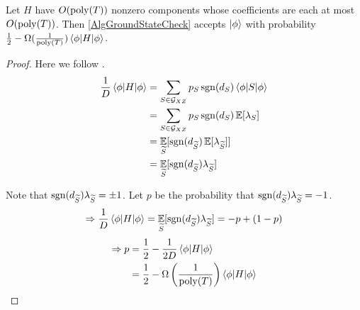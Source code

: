 \begin{thm}\label{ThmXZCheck}
	Let $H$ have $O(\operatorname*{\operatorname{poly}}(T))$ nonzero components whose coefficients are each at most $O(\operatorname*{\operatorname{poly}}(T))$.
	Then \autoref{AlgGroundStateCheck} accepts $\ket\phi$ with probability $\frac{1}{2}-\Omega(\frac{1}{\operatorname*{\operatorname{poly}}(T)})\braket{\phi|H|\phi}$.
\end{thm}
\begin{proof}

	Here we follow \cite{PhysRevA.93.022326}.
	\begin{align*}
		\frac{1}{D}\braket{\phi|H|\phi}&=\sum_{S\in\mathcal{G}_{XZ}} p_S\operatorname{sgn}(d_S)\braket{\phi|S|\phi}\\
		&=\sum_{S\in\mathcal{G}_{XZ}} p_S\operatorname{sgn}(d_S)\operatorname*{\mathbb{E}}[\lambda_S]\\
		&=\operatorname*{\mathbb{E}}_{\widetilde{S}}[\operatorname{sgn}(d_{\widetilde{S}})\operatorname*{\mathbb{E}}[\lambda_{\widetilde{S}}]]\\
		&=\operatorname*{\mathbb{E}}_{\widetilde{S}}[\operatorname{sgn}(d_{\widetilde{S}})\lambda_{\widetilde{S}}]
	\end{align*}

	Note that $\operatorname{sgn}(d_{\widetilde{S}})\lambda_{\widetilde{S}}=\pm1$. Let $p$ be the probability that $\operatorname{sgn}(d_{\widetilde{S}})\lambda_{\widetilde{S}}=-1$.
	$$\Rightarrow \frac{1}{D}\braket{\phi|H|\phi}=\operatorname*{\mathbb{E}}_{\widetilde{S}}[\operatorname{sgn}(d_{\widetilde{S}})\lambda_{\widetilde{S}}]=-p+(1-p)$$
	\begin{align*}
		\Rightarrow p&=\frac{1}{2}-\frac{1}{2D}\braket{\phi|H|\phi}\\
		&=\frac{1}{2}-\Omega\left(\frac{1}{\operatorname*{\operatorname{poly}}(T)}\right)\braket{\phi|H|\phi}
	\end{align*}

\end{proof}
